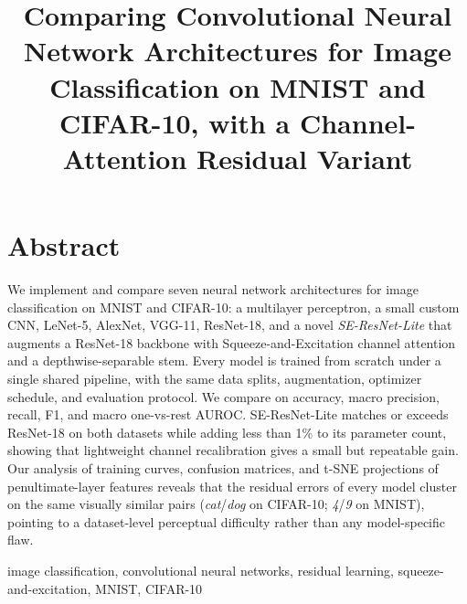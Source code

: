\documentclass[conference,10pt]{IEEEtran}
\begin{document}
\title{Comparing Convolutional Neural Network Architectures for Image
Classification on MNIST and CIFAR-10, with a Channel-Attention Residual Variant}

\author{
\and
{}
}

\maketitle

\section*{Abstract}
We implement and compare seven neural network architectures for image
classification on MNIST and CIFAR-10: a multilayer perceptron, a small
custom CNN, LeNet-5, AlexNet, VGG-11, ResNet-18, and a novel
\textit{SE-ResNet-Lite} that augments a ResNet-18 backbone with
Squeeze-and-Excitation channel attention and a depthwise-separable
stem. Every model is trained from scratch under a single shared
pipeline, with the same data splits, augmentation, optimizer schedule,
and evaluation protocol. We compare on accuracy, macro precision,
recall, F1, and macro one-vs-rest AUROC. SE-ResNet-Lite matches or
exceeds ResNet-18 on both datasets while adding less than 1\% to its
parameter count, showing that lightweight channel recalibration gives
a small but repeatable gain. Our analysis of training curves,
confusion matrices, and t-SNE projections of penultimate-layer
features reveals that the residual errors of every model cluster on
the same visually similar pairs (\emph{cat}/\emph{dog} on CIFAR-10;
\emph{4}/\emph{9} on MNIST), pointing to a dataset-level perceptual
difficulty rather than any model-specific flaw.

\begin{IEEEkeywords}
image classification, convolutional neural networks, residual learning,
squeeze-and-excitation, MNIST, CIFAR-10
\end{IEEEkeywords}
\end{document}
